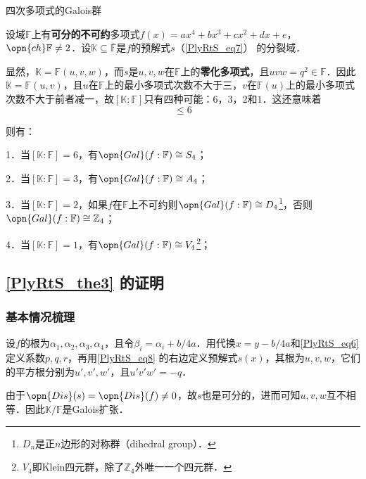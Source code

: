 \begin{theorem}{四次多项式的Galois群}\label{PlyRtS_the3}

设域$\mathbb{F}$上有\textbf{可分的不可约}多项式$f(x)=ax^4+bx^3+cx^2+dx+e$，$\opn{ch}\mathbb{F}\neq 2$．设$\mathbb{K}\subseteq\overline{\mathbb{F}}$是$f$的预解式$s$（\autoref{PlyRtS_eq7}） 的分裂域．

显然，$\mathbb{K}=\mathbb{F}(u, v, w)$，而$s$是$u, v, w$在$\mathbb{F}$上的\textbf{零化多项式}，且$uvw=q^2\in\mathbb{F}$．因此$\mathbb{K}=\mathbb{F}(u, v)$，且$u$在$\mathbb{F}$上的最小多项式次数不大于三，$v$在$\mathbb{F}(u)$上的最小多项式次数不大于前者减一，故$[\mathbb{K}:\mathbb{F}]$只有四种可能：$6$，$3$，$2$和$1$．这还意味着
\begin{equation}
[\mathbb{K}:\mathbb{F}]\leq 6
\end{equation}

则有：

1．当$[\mathbb{K}:\mathbb{F}]=6$，有$\opn{Gal}(f:\mathbb{F})\cong S_4$；

2．当$[\mathbb{K}:\mathbb{F}]=3$，有$\opn{Gal}(f:\mathbb{F})\cong A_4$；

3．当$[\mathbb{K}:\mathbb{F}]=2$，如果$f$在$\mathbb{F}$上不可约则$\opn{Gal}(f:\mathbb{F})\cong D_4$\footnote{$D_n$是正$n$边形的对称群（dihedral group）．}，否则$\opn{Gal}(f:\mathbb{F})\cong \mathbb{Z}_4$；

4．当$[\mathbb{K}:\mathbb{F}]=1$，有$\opn{Gal}(f:\mathbb{F})\cong V_4$\footnote{$V_4$即Klein四元群，除了$\mathbb{Z}_4$外唯一一个四元群．}；

\end{theorem}

\subsection{\autoref{PlyRtS_the3} 的证明}

\subsubsection{基本情况梳理}


设$f$的根为$\alpha_1, \alpha_2, \alpha_3, \alpha_4$，且令$\beta_i=\alpha_i+b/4a$．用代换$x=y-b/4a$和\autoref{PlyRtS_eq6} 定义系数$p, q, r$，再用\autoref{PlyRtS_eq8}  的右边定义预解式$s(x)$，其根为$u, v, w$，它们的平方根分别为$u', v', w'$，且$u'v'w'=-q$．

由于$\opn{Dis}(s)=\opn{Dis}(f)\neq 0$，故$s$也是可分的，进而可知$u, v, w$互不相等．因此$\mathbb{K}/\mathbb{F}$是Galois扩张．

